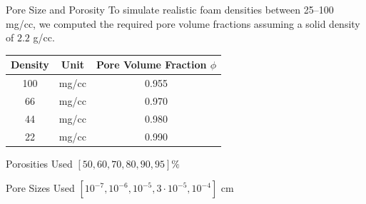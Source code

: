 \documentclass[aspectratio=169,xcolor=dvipsnames]{beamer}
\begin{document}
\begin{frame}{Pore Size and Porosity}
To simulate realistic foam densities between 25--100 mg/cc, we computed the required pore volume fractions assuming a solid density of $2.2$ g/cc.

\begin{table}[h!]
\centering
\begin{tabular}{ccc}
\toprule
\textbf{Density} & \textbf{Unit} & \textbf{Pore Volume Fraction $\phi$} \\
\midrule
100 & mg/cc & 0.955 \\
66  & mg/cc & 0.970 \\
44  & mg/cc & 0.980 \\
22  & mg/cc & 0.990 \\
\bottomrule
\end{tabular}

\end{table}

\begin{block}{Porosities Used}
    $[50, 60, 70, 80, 90, 95] \%$
\end{block}

\begin{block}{Pore Sizes Used}
$[10^{-7}, 10^{-6}, 10^{-5}, 3 \cdot 10^{-5}, 10^{-4}]$ cm
\end{block}
    
\end{frame}
\end{document}

